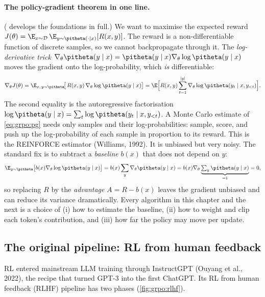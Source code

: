 \paragraph{The policy-gradient theorem in one line.} ( develops the foundations in full.) We want to maximise the expected
reward $J(\theta)=\E_{x\sim\mathcal{D}}\,\E_{y\sim\pitheta(\cdot\mid x)}[R(x,y)]$. The
reward is a non-differentiable function of discrete samples, so we cannot backpropagate
through it. The \emph{log-derivative trick}
$\nabla_\theta \pitheta(y\mid x)=\pitheta(y\mid x)\nabla_\theta\log\pitheta(y\mid x)$ moves
the gradient onto the log-probability, which \emph{is} differentiable:
\begin{equation}
\nabla_\theta J(\theta)
 = \E_{x,\,y\sim\pitheta}\!\big[\,R(x,y)\,\nabla_\theta\log\pitheta(y\mid x)\big]
 = \E\Big[R(x,y)\sum_{t=1}^{|y|}\nabla_\theta\log\pitheta(y_t\mid x,y_{<t})\Big].
\label{eq:grpo:pg}
\end{equation}
The second equality is the autoregressive factorisation
$\log\pitheta(y\mid x)=\sum_t\log\pitheta(y_t\mid x,y_{<t})$. A Monte Carlo estimate of
\cref{eq:grpo:pg} needs only samples and their log-probabilities: sample, score, and push
up the log-probability of each sample in proportion to its reward. This is the REINFORCE
estimator (Williams, 1992). It is unbiased but very noisy. The standard fix is to subtract a
\emph{baseline} $b(x)$ that does not depend on $y$:
\begin{equation}
\E_{y\sim\pitheta}\big[b(x)\nabla_\theta\log\pitheta(y\mid x)\big]
 = b(x)\sum_y\nabla_\theta\pitheta(y\mid x)
 = b(x)\nabla_\theta\underbrace{\textstyle\sum_y\pitheta(y\mid x)}_{=1}=0,
\end{equation}
so replacing $R$ by the \emph{advantage} $A=R-b(x)$ leaves the gradient unbiased and can
reduce its variance dramatically. Every algorithm in this chapter and the next is a choice
of (i) how to estimate the baseline, (ii) how to weight and clip each token's contribution,
and (iii) how far the policy may move per update.

\subsection{The original pipeline: RL from human feedback}\label{sec:grpo:rlhf}

RL entered mainstream LLM training through InstructGPT (Ouyang et al., 2022),
the recipe that turned GPT-3 into the first ChatGPT. Its RL from human feedback (RLHF)
pipeline has two phases (\cref{fig:grpo:rlhf}).

